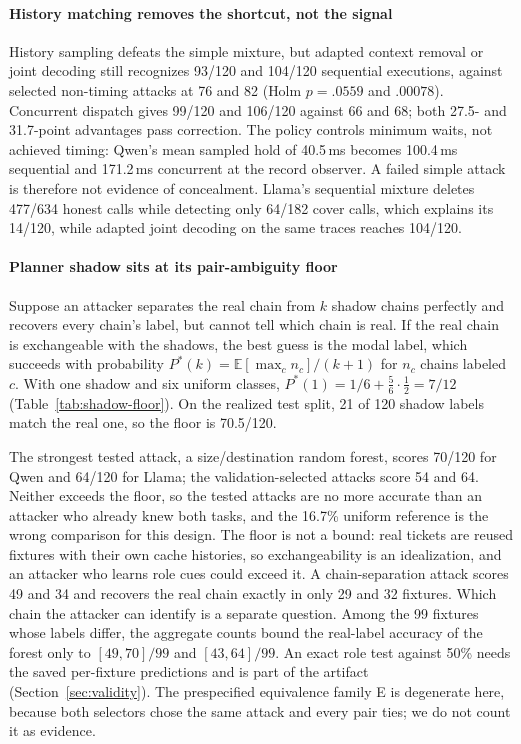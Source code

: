 \paragraph{History matching removes the shortcut, not the signal}
History sampling defeats the simple mixture, but adapted context removal or joint decoding still recognizes 93/120 and 104/120 sequential executions, against selected non-timing attacks at 76 and 82 (Holm $p=.0559$ and $.00078$). Concurrent dispatch gives 99/120 and 106/120 against 66 and 68; both 27.5- and 31.7-point advantages pass correction. The policy controls minimum waits, not achieved timing: Qwen's mean sampled hold of 40.5\,ms becomes 100.4\,ms sequential and 171.2\,ms concurrent at the record observer. A failed simple attack is therefore not evidence of concealment. Llama's sequential mixture deletes 477/634 honest calls while detecting only 64/182 cover calls, which explains its 14/120, while adapted joint decoding on the same traces reaches 104/120.



\paragraph{Planner shadow sits at its pair-ambiguity floor}
Suppose an attacker separates the real chain from $k$ shadow chains perfectly and recovers every chain's label, but cannot tell which chain is real. If the real chain is exchangeable with the shadows, the best guess is the modal label, which succeeds with probability $P^*(k)=\mathbb{E}[\max_c n_c]/(k+1)$ for $n_c$ chains labeled $c$. With one shadow and six uniform classes, $P^*(1)=1/6+\tfrac{5}{6}\cdot\tfrac12=7/12$ (Table~\ref{tab:shadow-floor}). On the realized test split, 21 of 120 shadow labels match the real one, so the floor is 70.5/120.

The strongest tested attack, a size/destination random forest, scores 70/120 for Qwen and 64/120 for Llama; the validation-selected attacks score 54 and 64. Neither exceeds the floor, so the tested attacks are no more accurate than an attacker who already knew both tasks, and the 16.7\% uniform reference is the wrong comparison for this design. The floor is not a bound: real tickets are reused fixtures with their own cache histories, so exchangeability is an idealization, and an attacker who learns role cues could exceed it. A chain-separation attack scores 49 and 34 and recovers the real chain exactly in only 29 and 32 fixtures. Which chain the attacker can identify is a separate question. Among the 99 fixtures whose labels differ, the aggregate counts bound the real-label accuracy of the forest only to $[49,70]/99$ and $[43,64]/99$. An exact role test against 50\% needs the saved per-fixture predictions and is part of the artifact (Section~\ref{sec:validity}). The prespecified equivalence family E is degenerate here, because both selectors chose the same attack and every pair ties; we do not count it as evidence.

